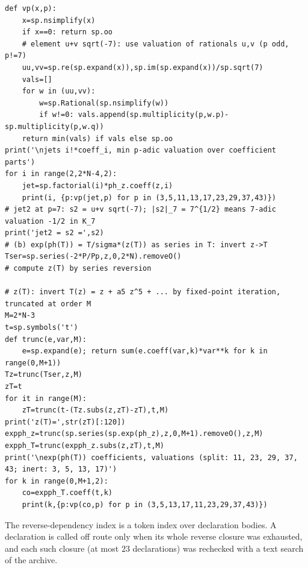 \documentclass[11pt]{article}
\theoremstyle{remark}
\begin{document}
\begin{lstlisting}
def vp(x,p):
    x=sp.nsimplify(x)
    if x==0: return sp.oo
    # element u+v sqrt(-7): use valuation of rationals u,v (p odd, p!=7)
    uu,vv=sp.re(sp.expand(x)),sp.im(sp.expand(x))/sp.sqrt(7)
    vals=[]
    for w in (uu,vv):
        w=sp.Rational(sp.nsimplify(w))
        if w!=0: vals.append(sp.multiplicity(p,w.p)-sp.multiplicity(p,w.q))
    return min(vals) if vals else sp.oo
print('\njets i!*coeff_i, min p-adic valuation over coefficient parts')
for i in range(2,2*N-4,2):
    jet=sp.factorial(i)*ph_z.coeff(z,i)
    print(i, {p:vp(jet,p) for p in (3,5,11,13,17,23,29,37,43)})
# jet2 at p=7: s2 = u+v sqrt(-7); |s2|_7 = 7^{1/2} means 7-adic valuation -1/2 in K_7
print('jet2 = s2 =',s2)
# (b) exp(ph(T)) = T/sigma*(z(T)) as series in T: invert z->T
Tser=sp.series(-2*P/Pp,z,0,2*N).removeO()
# compute z(T) by series reversion

# z(T): invert T(z) = z + a5 z^5 + ... by fixed-point iteration, truncated at order M
M=2*N-3
t=sp.symbols('t')
def trunc(e,var,M):
    e=sp.expand(e); return sum(e.coeff(var,k)*var**k for k in range(0,M+1))
Tz=trunc(Tser,z,M)
zT=t
for it in range(M):
    zT=trunc(t-(Tz.subs(z,zT)-zT),t,M)
print('z(T)=',str(zT)[:120])
expph_z=trunc(sp.series(sp.exp(ph_z),z,0,M+1).removeO(),z,M)
expph_T=trunc(expph_z.subs(z,zT),t,M)
print('\nexp(ph(T)) coefficients, valuations (split: 11, 23, 29, 37, 43; inert: 3, 5, 13, 17)')
for k in range(0,M+1,2):
    co=expph_T.coeff(t,k)
    print(k,{p:vp(co,p) for p in (3,5,13,17,11,23,29,37,43)})
\end{lstlisting}


The reverse-dependency index is a token index over declaration bodies. A declaration is called off route only when its whole reverse closure was exhausted, and each such closure (at most $23$ declarations) was rechecked with a text search of the archive.
\end{document}
